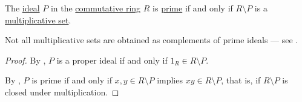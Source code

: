 \begin{proposition}\label{thm:complement_of_prime_ideal}
  The \hyperref[def:semiring_ideal]{ideal} \( P \) in the \hyperref[def:ring/commutative]{commutative ring} \( R \) is \hyperref[def:semiring_ideal/prime]{prime} if and only if \( R \setminus P \) is a \hyperref[def:multiplicative_set_in_ring]{multiplicative set}.
\end{proposition}
\begin{comments}
  \item Not all multiplicative sets are obtained as complements of prime ideals --- see .
\end{comments}
\begin{proof}
  By , \( P \) is a proper ideal if and only if \( 1_R \in R \setminus P \).

  By , \( P \) is prime if and only if \( x, y \in R \setminus P \) implies \( xy \in R \setminus P \), that is, if \( R \setminus P \) is closed under multiplication.
\end{proof}

